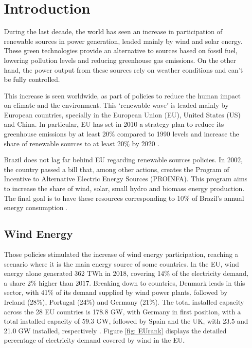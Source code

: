 
\chapter[Introduction]{Introduction}

During the last decade, the world has seen an increase in participation of renewable sources in power generation, leaded mainly by wind and solar energy. These green technologies provide an alternative to sources based on fossil fuel, lowering pollution levels and reducing greenhouse gas emissions. On the other hand, the power output from these sources rely on weather conditions and can't be fully controlled.

This increase is seen worldwide, as part of policies to reduce the human impact on climate and the environment. This `renewable wave' is leaded mainly by European countries, specially in the European Union (EU), United States (US) and China. In particular, EU has set in 2010 a strategy plan to reduce its greenhouse emissions by at least 20\% compared to 1990 levels and increase the share of renewable sources to at least 20\% by 2020 \cite{Europe2020}.

Brazil does not lag far behind EU regarding renewable sources policies. In 2002, the country passed a bill that, among other actions, creates the Program of Incentive to Alternative Electric Energy Sources (PROINFA). This program aims to increase the share of wind, solar, small hydro and biomass energy production. The final goal is to have these resources corresponding to 10\% of Brazil's annual energy consumption \cite{PROINFA2002}.

\section{Wind Energy}

Those policies stimulated the increase of wind energy participation, reaching a scenario where it is the main energy source of some countries. In the EU, wind energy alone generated 362 TWh in 2018, covering 14\% of the electricity demand, a share 2\% higher than 2017. Breaking down to countries, Denmark leads in this sector, with 41\% of its demand supplied by wind power plants, followed by Ireland (28\%), Portugal (24\%) and Germany (21\%). The total installed capacity across the 28 EU countries is 178.8 GW, with Germany in first position, with a total installed capacity of 59.3 GW, followed by Spain and the UK, with 23.5 and 21.0 GW installed, respectively \cite{WindEurope2019}. Figure \ref{fig: EUrank} displays the detailed percentage of electricity demand covered by wind in the EU.

